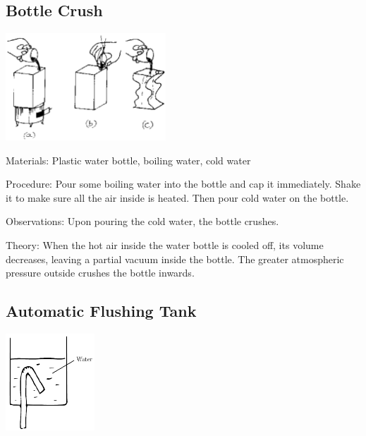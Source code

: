 \begin{multicols}{2}
\subsection{Bottle Crush}

\begin{center}
\includegraphics[width=0.45\textwidth]{./img/source/bottle-crush.png}
\end{center}

\begin{description*}
\item[Materials:]{Plastic water bottle, boiling water, cold water}
\item[Procedure:]{Pour some boiling water into the bottle and cap it immediately. Shake it to make sure all the air inside is heated. Then pour cold water on the bottle.}
\item[Observations:]{Upon pouring the cold water, the bottle crushes.}
\item[Theory:]{When the hot air inside the water bottle is cooled off, its volume decreases, leaving a partial vacuum inside the bottle. The greater atmospheric pressure outside crushes the bottle inwards.}
\end{description*}

\subsection{Automatic Flushing Tank}
\label{sub:auto-tank}

\begin{center}
\includegraphics[width=0.25\textwidth]{./img/auto-flushing-tank.png}
\end{center}


\end{multicols}
